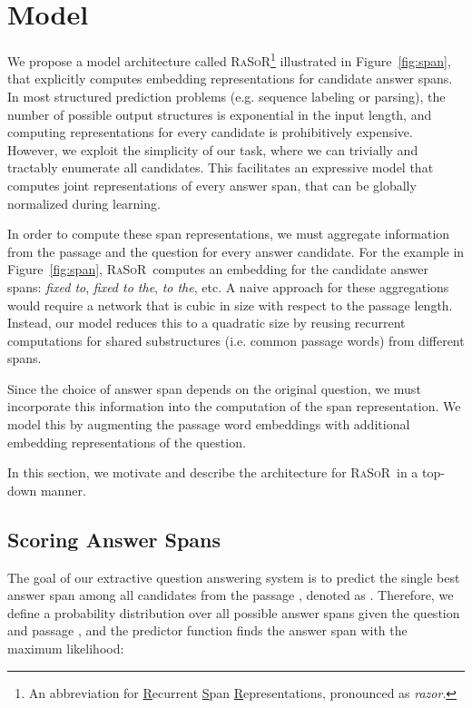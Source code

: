 \documentclass{article} \usepackage{iclr2017_conference,times}
\newcommand{\ourmodel}{\textsc{RaSoR}}
\begin{document}
 \section{Model}
\label{sec:model}
We propose a model architecture called \ourmodel\footnote{An abbreviation for \underline{R}ecurrent \underline{S}pan \underline{R}epresentations, pronounced as \textit{razor}.} illustrated in Figure~{\ref{fig:span}}, that explicitly computes embedding representations for candidate answer spans.
In most structured prediction problems (e.g. sequence labeling or parsing), the number of possible output structures is exponential in the input length, and computing representations for every candidate is prohibitively expensive.
However, we exploit the simplicity of our task, where we can trivially and tractably enumerate all candidates.
This facilitates an expressive model that computes joint representations of every answer span, that can be globally normalized during learning.

In order to compute these span representations, we must aggregate information from the passage and the question for every answer candidate. For the example in Figure~\ref{fig:span}, \ourmodel~computes an embedding for the candidate answer spans: \textit{fixed to}, \textit{fixed to the}, \textit{to the}, etc. A naive approach for these aggregations would require a network that is cubic in size with respect to the passage length.
Instead, our model reduces this to a quadratic size by reusing recurrent computations for shared substructures (i.e. common passage words) from different spans.

Since the choice of answer span depends on the original question, we must incorporate this information into the computation of the span representation. We model this by augmenting the passage word embeddings with additional embedding representations of the question.

In this section, we motivate and describe the architecture for \ourmodel~in a top-down manner.

\subsection{Scoring Answer Spans}
The goal of our extractive question answering system is to predict the single best answer span among all candidates from the passage , denoted as .
Therefore, we define a probability distribution over all possible answer spans given the question  and passage , and the predictor function finds the answer span with the maximum likelihood:
\end{document}
